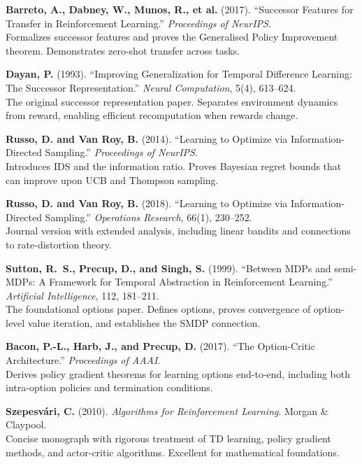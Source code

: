 \documentclass[11pt,a4paper]{article}
\begin{document}
\begin{enumerate}[label={[\arabic*]}, leftmargin=*, itemsep=6pt]
\item \textbf{Barreto, A., Dabney, W., Munos, R., et al.} (2017).
  ``Successor Features for Transfer in Reinforcement Learning.''
  \textit{Proceedings of NeurIPS}. \\
  Formalizes successor features and proves the Generalised Policy Improvement
  theorem. Demonstrates zero-shot transfer across tasks.

\item \textbf{Dayan, P.} (1993).
  ``Improving Generalization for Temporal Difference Learning: The Successor
  Representation.'' \textit{Neural Computation}, 5(4), 613--624. \\
  The original successor representation paper. Separates environment dynamics
  from reward, enabling efficient recomputation when rewards change.

\item \textbf{Russo, D. and Van Roy, B.} (2014).
  ``Learning to Optimize via Information-Directed Sampling.''
  \textit{Proceedings of NeurIPS}. \\
  Introduces IDS and the information ratio. Proves Bayesian regret bounds
  that can improve upon UCB and Thompson sampling.

\item \textbf{Russo, D. and Van Roy, B.} (2018).
  ``Learning to Optimize via Information-Directed Sampling.''
  \textit{Operations Research}, 66(1), 230--252. \\
  Journal version with extended analysis, including linear bandits and
  connections to rate-distortion theory.

\item \textbf{Sutton, R.~S., Precup, D., and Singh, S.} (1999).
  ``Between MDPs and semi-MDPs: A Framework for Temporal Abstraction in
  Reinforcement Learning.'' \textit{Artificial Intelligence}, 112, 181--211. \\
  The foundational options paper. Defines options, proves convergence of
  option-level value iteration, and establishes the SMDP connection.

\item \textbf{Bacon, P.-L., Harb, J., and Precup, D.} (2017).
  ``The Option-Critic Architecture.''
  \textit{Proceedings of AAAI}. \\
  Derives policy gradient theorems for learning options end-to-end,
  including both intra-option policies and termination conditions.

\item \textbf{Szepesv\'ari, C.} (2010).
  \textit{Algorithms for Reinforcement Learning}. Morgan \& Claypool. \\
  Concise monograph with rigorous treatment of TD learning, policy gradient
  methods, and actor-critic algorithms. Excellent for mathematical foundations.


\end{enumerate}
\end{document}
